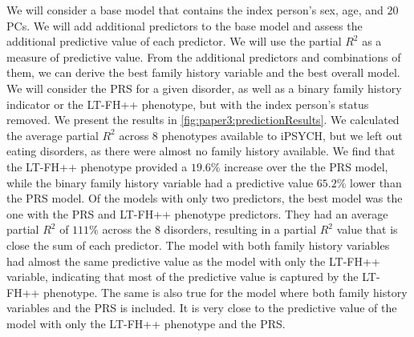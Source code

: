 We will consider a base model that contains the index person's sex, age, and $ 20 $ PCs. We will add additional predictors to the base model and assess the additional predictive value of each predictor. We will use the partial $ R^2 $ as a measure of predictive value. From the additional predictors and combinations of them, we can derive the best family history variable and the best overall model. We will consider the PRS for a given disorder, as well as a binary family history indicator or the LT-FH++ phenotype, but with the index person's status removed. We present the results in \cref{fig:paper3:predictionResults}. We calculated the average partial $ R^2 $ across $ 8 $ phenotypes available to iPSYCH, but we left out eating disorders, as there were almost no family history available. We find that the LT-FH++ phenotype provided a $ 19.6\% $ increase over the the PRS model, while the binary family history variable had a predictive value $ 65.2\% $ lower than the PRS model. Of the models with only two predictors, the best model was the one with the PRS and LT-FH++ phenotype predictors. They had an average partial $ R^2 $ of $ 111\% $ across the $ 8 $ disorders, resulting in a partial $ R^2 $ value that is close the sum of each predictor. The model with both family history variables had almost the same predictive value as the model with only the LT-FH++ variable, indicating that most of the predictive value is captured by the LT-FH++ phenotype. The same is also true for the model where both family history variables and the PRS is included. It is very close to the predictive value of the model with only the LT-FH++ phenotype and the PRS.
